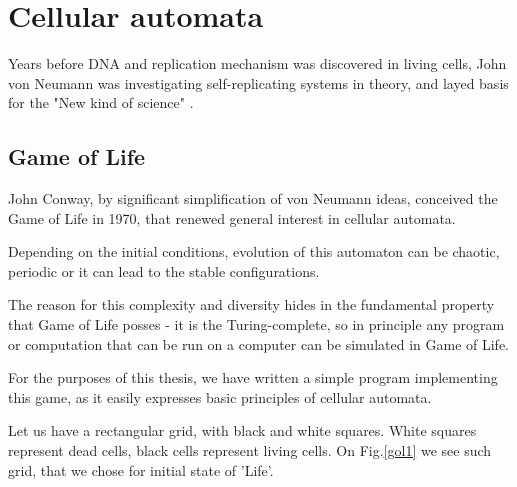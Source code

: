 \chapter{Cellular automata}


Years before DNA and replication mechanism was discovered in living cells,
John von Neumann was investigating self-replicating systems in theory, 
and layed basis for the "New kind of science" \cite{wolfram}. 



\section{Game of Life}

John Conway, by significant simplification of von Neumann ideas, conceived the Game of Life in 1970, that renewed general interest in cellular automata.

Depending on the initial conditions, evolution of this automaton can be chaotic, periodic or it can lead to the stable configurations.

The reason for this complexity and diversity hides in the fundamental property that Game of Life posses - it is the Turing-complete, so in principle any program or computation that can be run on a computer can be simulated in Game of Life.   

For the purposes of this thesis, we have written a simple program implementing this game, as it easily expresses basic principles of cellular automata.

Let us have a rectangular grid, with black and white squares. 
White squares represent dead cells, black cells represent living cells.
On Fig.\ref{gol1} we see such grid, that we chose for initial state of 'Life'.


